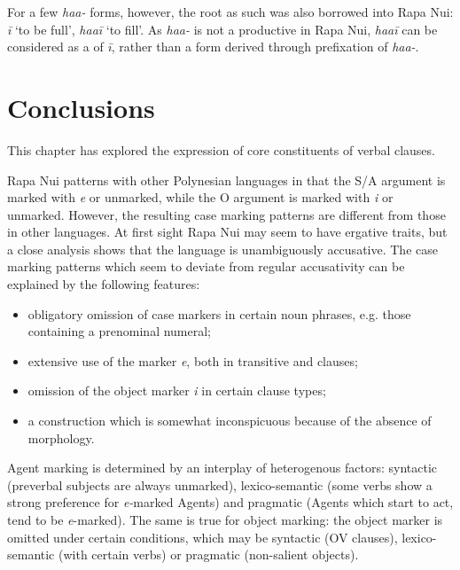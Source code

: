 For a few \textit{ha{\ꞌ}a-} forms, however, the root as such was also borrowed into Rapa Nui: \textit{{\ꞌ}ī} ‘to be full’, \textit{ha{\ꞌ}a{\ꞌ}ī} ‘to fill’. As \textit{ha{\ꞌ}a-} is not a productive  in Rapa Nui, \textit{ha{\ꞌ}a{\ꞌ}ī} can be considered as a  of \textit{{\ꞌ}ī}, rather than a form derived through prefixation of \textit{ha{\ꞌ}a-}.
\section{Conclusions}\label{sec:8.13}

This chapter has explored the expression of core constituents of verbal clauses.

Rapa Nui patterns with other Polynesian languages in that the S/A argument is marked with \textit{e} or unmarked, while the O argument is marked with \textit{i} or unmarked. However, the resulting case marking patterns are different from those in other languages. At first sight Rapa Nui may seem to have ergative traits, but a close analysis shows that the language is unambiguously accusative. The case marking patterns which seem to deviate from regular accusativity can be explained by the following features:

\begin{itemize}
\item 
obligatory omission of case markers in certain noun phrases, e.g. those containing a prenominal numeral;

\item 
extensive use of the  marker \textit{e}, both in transitive and  clauses;

\item 
omission of the object marker \textit{i} in certain clause types;

\item 
a  construction which is somewhat inconspicuous because of the absence of  morphology.

\end{itemize}

Agent marking is determined by an interplay of heterogenous factors: syntactic (preverbal subjects are always unmarked), lexico-semantic (some verbs show a strong preference for \textit{e-}marked Agents) and pragmatic (Agents which start to act, tend to be \textit{e}{}-marked). The same is true for object marking: the object marker is omitted under certain conditions, which may be syntactic (OV clauses), lexico-semantic (with certain verbs) or pragmatic (non-salient objects).

